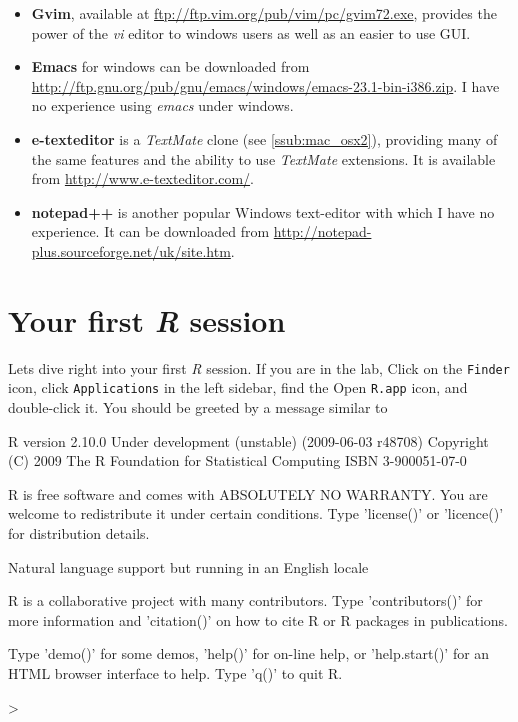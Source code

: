 \documentclass[10pt,letterpaper]{article}
\begin{document}
\begin{itemize}
    \item \textbf{Gvim}, available at \url{ftp://ftp.vim.org/pub/vim/pc/gvim72.exe}, provides the power of the \emph{vi} editor to windows users as well as an easier to use GUI.
    \item \textbf{Emacs} for windows can be downloaded from  \url{http://ftp.gnu.org/pub/gnu/emacs/windows/emacs-23.1-bin-i386.zip}.  I have no experience using \emph{emacs} under windows.
    \item \textbf{e-texteditor} is a \emph{TextMate} clone (see  \ref{ssub:mac_osx2}), providing many of the same features and the ability to use \emph{TextMate} extensions.  It is available from  \url{http://www.e-texteditor.com/}.
    \item \textbf{notepad++} is another popular Windows text-editor with which I have no experience.  It can be downloaded from  \url{http://notepad-plus.sourceforge.net/uk/site.htm}.
\end{itemize}

\section{Your first \emph{R} session}
\label{sec:first_r_session}

Lets dive right into your first \emph{R} session.  If you are in the lab, Click on the \texttt{Finder} icon, click \texttt{Applications} in the left sidebar, find the Open \texttt{R.app} icon, and double-click it.  You should be greeted by a message similar to

\begin{Schunk}
\begin{Soutput}
R version 2.10.0 Under development (unstable) (2009-06-03 r48708)
Copyright (C) 2009 The R Foundation for Statistical Computing
ISBN 3-900051-07-0

R is free software and comes with ABSOLUTELY NO WARRANTY.
You are welcome to redistribute it under certain conditions.
Type 'license()' or 'licence()' for distribution details.

  Natural language support but running in an English locale

R is a collaborative project with many contributors.
Type 'contributors()' for more information and
'citation()' on how to cite R or R packages in publications.

Type 'demo()' for some demos, 'help()' for on-line help, or
'help.start()' for an HTML browser interface to help.
Type 'q()' to quit R.

>
\end{Soutput}
\end{Schunk}
\end{document}
